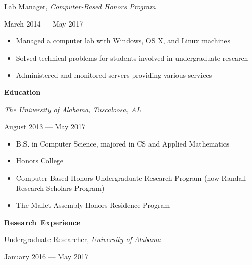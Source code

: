 \documentclass[11pt]{article}
\begin{document}
\begin{minipage}[t]{0.65\textwidth}
\flushleft
Lab Manager, \textit{Computer-Based Honors Program}\\
\end{minipage}
\begin{minipage}[t]{0.30\textwidth}
\flushright
March 2014 --- May 2017\\
\end{minipage}

\begin{itemize}
  \item Managed a computer lab with Windows, OS X, and Linux machines
  \item Solved technical problems for students involved in undergraduate research
  \item Administered and monitored servers providing various services
\end{itemize}

\vspace{0.6em}
\hbox{\large \textbf{Education}}

\begin{minipage}[t]{0.65\textwidth}
\flushleft
\textit{The University of Alabama, Tuscaloosa, AL}\\
\end{minipage}
\begin{minipage}[t]{0.30\textwidth}
\flushright
August 2013 --- May 2017\\
\end{minipage}

\begin{itemize}
  \item B.S. in Computer Science, majored in CS and Applied Mathematics
  \item Honors College
  \item Computer-Based Honors Undergraduate Research Program (now Randall Research Scholars Program)
  \item The Mallet Assembly Honors Residence Program
\end{itemize}

\vspace{0.6em}
\hbox{\large \textbf{Research Experience}}

\vspace{0.4em}
\begin{minipage}[t]{0.65\textwidth}
\flushleft
Undergraduate Researcher, \textit{University of Alabama}\\
\end{minipage}
\begin{minipage}[t]{0.30\textwidth}
\flushright
January 2016 --- May 2017\\
\end{minipage}
\end{document}
